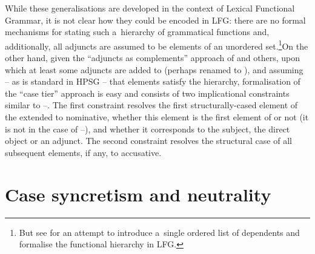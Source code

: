 \documentclass[output=paper,biblatex,babelshorthands,newtxmath,draftmode,colorlinks,citecolor=brown]{langscibook}
\begin{document}
\largerpage[2]
While these generalisations are developed in the context of Lexical Functional Grammar, it is not
clear how they could be encoded in LFG: there are no formal mechanisms for stating such a~hierarchy
of grammatical functions and, additionally, all adjuncts are assumed to be elements of an unordered
set.\footnote{But see \citet{Prze2016a} for an attempt to introduce a~single ordered list of
  dependents and formalise the functional hierarchy in LFG\@.}\indexlfgend On the other hand, given
the ``adjuncts as complements'' approach of \citet{BMS2001a} and others, upon which at least some
adjuncts are added to  (perhaps renamed to ), and assuming – as is standard
in HPSG – that  elements satisfy the  hierarchy, formalisation of the “case
tier” approach is easy and consists of two implicational constraints similar to
–.  The first constraint resolves the first
structurally-cased element of the extended  to nominative, whether this element is the
first element of  or not (it is not in the case of –), and whether
it corresponds to the subject, the direct object or an adjunct.  The second constraint resolves the
structural case of all subsequent elements, if any, to accusative.





\section{Case syncretism and neutrality}
\label{sec:case:syn}
\end{document}
